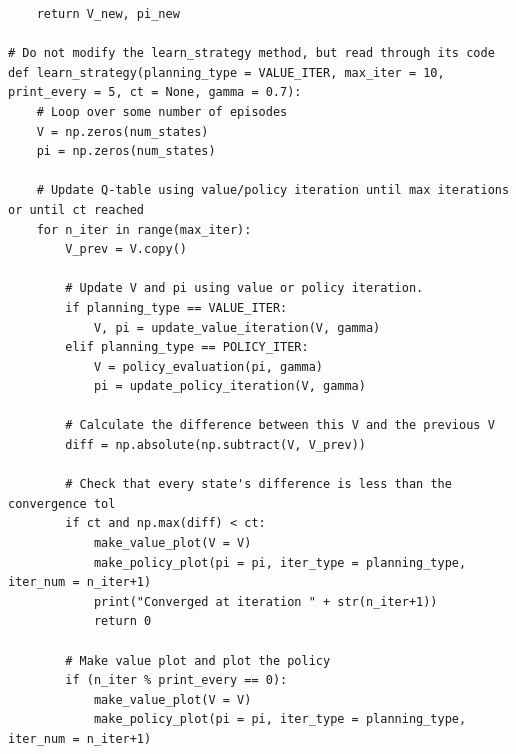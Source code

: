 \documentclass[submit]{../harvardml}
\begin{document}
\begin{lstlisting}
    return V_new, pi_new

# Do not modify the learn_strategy method, but read through its code
def learn_strategy(planning_type = VALUE_ITER, max_iter = 10, print_every = 5, ct = None, gamma = 0.7):
    # Loop over some number of episodes
    V = np.zeros(num_states)
    pi = np.zeros(num_states)

    # Update Q-table using value/policy iteration until max iterations or until ct reached
    for n_iter in range(max_iter):
        V_prev = V.copy()

        # Update V and pi using value or policy iteration.
        if planning_type == VALUE_ITER:
            V, pi = update_value_iteration(V, gamma)
        elif planning_type == POLICY_ITER:
            V = policy_evaluation(pi, gamma)
            pi = update_policy_iteration(V, gamma)
        
        # Calculate the difference between this V and the previous V
        diff = np.absolute(np.subtract(V, V_prev))

        # Check that every state's difference is less than the convergence tol
        if ct and np.max(diff) < ct:
            make_value_plot(V = V)
            make_policy_plot(pi = pi, iter_type = planning_type, iter_num = n_iter+1)
            print("Converged at iteration " + str(n_iter+1))
            return 0

        # Make value plot and plot the policy
        if (n_iter % print_every == 0):
            make_value_plot(V = V)
            make_policy_plot(pi = pi, iter_type = planning_type, iter_num = n_iter+1)
\end{lstlisting}

\newpage 
\end{document}
